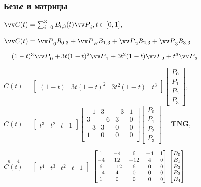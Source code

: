 \documentclass[10pt]{beamer}
\begin{document}
\begin{frame}\frametitle{Безье и матрицы}
	
	$\VV C(t)=\sum_{i=0}^3 B_{i,3}(t) \VV P_i , t\in[0,1]$,
	
	$\VV C(t)=\VV P_0B_{0,3}+\VV P_BB_{1,3}+\VV P_2B_{2,3}+\VV P_3B_{3,3}$=
	
	\hfill$=(1-t)^3\VV P_0+3t(1-t)^2\VV P_1+3t^2(1-t)\VV P_2+t^3\VV P_3$
	
	\pause
	$C(t)=
	\begin{bmatrix}
		(1-t) & 3t(1-t)^2 & 3t^2(1-t) & t^3
	\end{bmatrix}
	\begin{bmatrix}
		P_0\\
		P_1\\
		P_2\\
		P_3
	\end{bmatrix}$,
	$
	C(t)=
	\begin{bmatrix}
		t^3 & t^2 & t & 1
	\end{bmatrix}
	\begin{bmatrix}
		-1& 3& -3&1  \\
		3& -6& 3& 0  \\
		-3& 3&0 &0  \\
		1&0 &0 &0  \\
	\end{bmatrix}
	\begin{bmatrix}
		P_0\\
		P_1\\
		P_2\\
		P_3
	\end{bmatrix}
	=\mathbf{TNG},
	$
	
	\pause
	$
	\overset{n=4}{C(t)}=
	\begin{bmatrix}
		t^4 & t^3 & t^2 & t & 1
	\end{bmatrix}
	$
	$\footnotesize 
	\begin{bmatrix}
		1& -4& 6& -4 &1  \\
		-4& 12& -12& 4 &0 \\
		6& -12& 6 &0 & 0 \\
		-4& 4 &0 &0& 0  \\
		1&0&0&0&0
	\end{bmatrix}
	\begin{bmatrix}
		B_0\\
		B_1\\
		B_2\\
		B_3\\
		B_4
	\end{bmatrix}.
	$
	
	
	
\end{frame}
\end{document}
